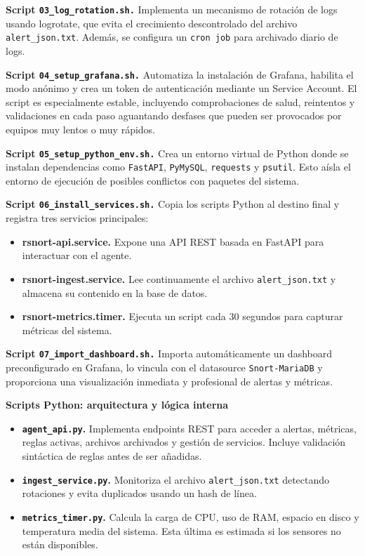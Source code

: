 \documentclass[11pt,a4paper,twoside]{report}
\begin{document}
\textbf{Script \texttt{03\_log\_rotation.sh.}} Implementa un mecanismo de rotación de logs usando logrotate, que evita el crecimiento descontrolado del archivo \texttt{alert\_json.txt}. Además, se configura un \texttt{cron job} para archivado diario de logs.\newline

\textbf{Script \texttt{04\_setup\_grafana.sh.}} Automatiza la instalación de Grafana, habilita el modo anónimo y crea un token de autenticación mediante un Service Account. El script es especialmente estable, incluyendo comprobaciones de salud, reintentos y validaciones en cada paso aguantando desfases que pueden ser provocados por equipos muy lentos o muy rápidos.\newline

\textbf{Script \texttt{05\_setup\_python\_env.sh.}} Crea un entorno virtual de Python donde se instalan dependencias como \texttt{FastAPI}, \texttt{PyMySQL}, \texttt{requests} y \texttt{psutil}. Esto aísla el entorno de ejecución de posibles conflictos con paquetes del sistema.\newline

\textbf{Script \texttt{06\_install\_services.sh.}} Copia los scripts Python al destino final y registra tres servicios principales:

\begin{itemize}
	\item \textbf{rsnort-api.service.} Expone una API REST basada en FastAPI para interactuar con el agente.
	\item \textbf{rsnort-ingest.service.} Lee continuamente el archivo \texttt{alert\_json.txt} y almacena su contenido en la base de datos.
	\item \textbf{rsnort-metrics.timer.} Ejecuta un script cada 30 segundos para capturar métricas del sistema.
\end{itemize}

\textbf{Script \texttt{07\_import\_dashboard.sh.}} Importa automáticamente un dashboard preconfigurado en Grafana, lo vincula con el datasource \texttt{Snort-MariaDB} y proporciona una visualización inmediata y profesional de alertas y métricas.\newline

\textbf{Scripts Python: arquitectura y lógica interna}

\begin{itemize}
	\item \textbf{\texttt{agent\_api.py}.} Implementa endpoints REST para acceder a alertas, métricas, reglas activas, archivos archivados y gestión de servicios. Incluye validación sintáctica de reglas antes de ser añadidas.
	\item \textbf{\texttt{ingest\_service.py}.} Monitoriza el archivo \texttt{alert\_json.txt} detectando rotaciones y evita duplicados usando un hash de línea.
	\item \textbf{\texttt{metrics\_timer.py}.} Calcula la carga de CPU, uso de RAM, espacio en disco y temperatura media del sistema. Esta última es estimada si los sensores no están disponibles.
\end{itemize}
\end{document}
